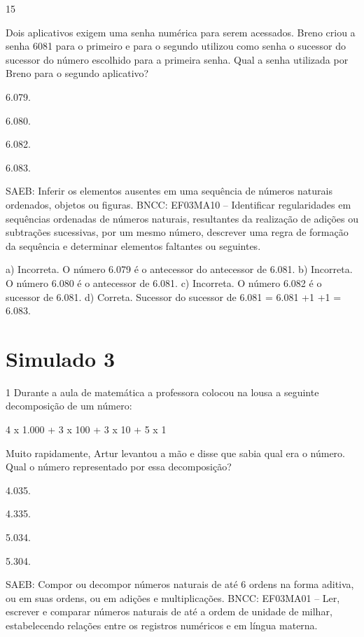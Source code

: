 \begin{multicols}{2}
{\begin{escolha}
{\num{15}

Dois aplicativos exigem uma senha numérica para serem acessados. Breno criou a senha 6081 para o primeiro e para o segundo utilizou como senha o sucessor do sucessor do número escolhido para a primeira senha. Qual a senha utilizada por Breno para o segundo aplicativo?

\begin{escolha}
\item
  6.079.
\item
  6.080.
\item
  6.082.
\item
  6.083.
\end{escolha}

SAEB: Inferir os elementos ausentes em uma sequência de números naturais ordenados, objetos ou figuras.
BNCC: EF03MA10 -- Identificar regularidades em sequências ordenadas de números naturais,
resultantes da realização de adições ou subtrações sucessivas, por um mesmo número,
descrever uma regra de formação da sequência e determinar elementos faltantes ou seguintes.

a) Incorreta. O número 6.079 é o antecessor do antecessor de 6.081.
b) Incorreta. O número 6.080 é o antecessor de 6.081.
c) Incorreta. O número 6.082 é o sucessor de 6.081.
d) Correta. Sucessor do sucessor de 6.081 = 6.081 +1 +1 = 6.083.

\chapter{Simulado 3}

\num{1} Durante a aula de matemática a professora colocou na lousa a seguinte decomposição de um número:

4 x 1.000 + 3 x 100 + 3 x 10 + 5 x 1

Muito rapidamente, Artur levantou a mão e disse que sabia qual era o número. Qual o número representado por essa decomposição?

\begin{escolha}
\item
  4.035.
\item
  4.335.
\item
  5.034.
\item
  5.304.
\end{escolha}

SAEB: Compor ou decompor números naturais de até 6 ordens na forma aditiva, ou em suas ordens, ou em adições e multiplicações.
BNCC: EF03MA01 -- Ler, escrever e comparar números naturais de até a ordem de unidade de milhar, estabelecendo relações entre os registros numéricos e em língua materna.

}
\end{escolha}}
\end{multicols}

